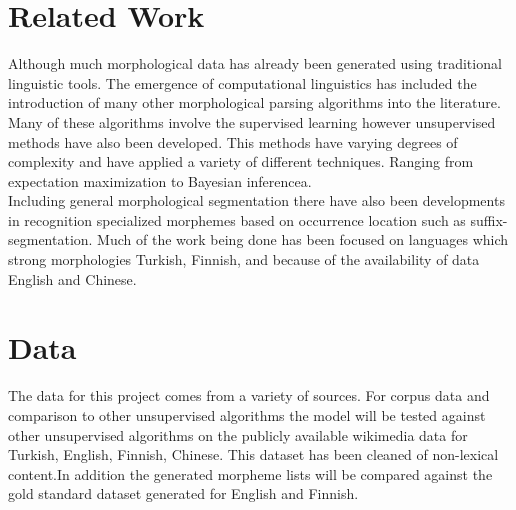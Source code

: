 \documentclass[11pt,a4paper]{article}
\begin{document}
\section{Related Work}
Although much morphological data has already been generated using traditional 
linguistic tools. The emergence of computational linguistics has included the
introduction of many other morphological parsing algorithms into the 
literature. Many of these algorithms involve the supervised learning however
unsupervised methods have also been developed. This methods have varying 
degrees of complexity and have applied a variety of different techniques. 
Ranging from expectation maximization to Bayesian inferencea.\\
Including general morphological segmentation there have also been developments
in recognition specialized morphemes based on occurrence location such as 
suffix-segmentation. Much of the work being done has been focused on languages
which strong morphologies Turkish, Finnish, and because of the availability of
data English and Chinese. 

\section{Data}
The data for this project comes from a variety of sources. For corpus data
and comparison to other unsupervised algorithms the model will be tested 
against other unsupervised algorithms on the publicly available wikimedia
data for Turkish, English, Finnish, Chinese. This dataset has been cleaned of 
non-lexical content.In addition the generated morpheme lists will be 
compared against the gold standard dataset generated for English and Finnish.
 
\end{document}
